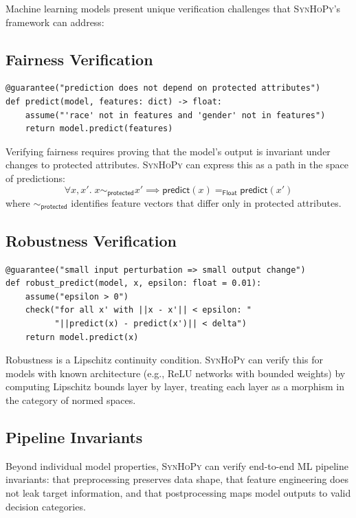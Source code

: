 \documentclass[11pt,a4paper]{report}
\theoremstyle{definition}
\theoremstyle{plain}
\newcommand{\synhopy}{\textsc{SynHoPy}}
\begin{document}
Machine learning models present unique verification challenges that
\synhopy{}'s framework can address:

\subsection{Fairness Verification}

\begin{lstlisting}[style=synhopy]
@guarantee("prediction does not depend on protected attributes")
def predict(model, features: dict) -> float:
    assume("'race' not in features and 'gender' not in features")
    return model.predict(features)
\end{lstlisting}

Verifying fairness requires proving that the model's output is invariant
under changes to protected attributes.  \synhopy{} can express this as a
path in the space of predictions:
\[
  \forall x, x'.\; x \sim_{\mathsf{protected}} x' \implies
  \mathsf{predict}(x) =_{\mathsf{Float}} \mathsf{predict}(x')
\]
where $\sim_{\mathsf{protected}}$ identifies feature vectors that differ
only in protected attributes.

\subsection{Robustness Verification}

\begin{lstlisting}[style=synhopy]
@guarantee("small input perturbation => small output change")
def robust_predict(model, x, epsilon: float = 0.01):
    assume("epsilon > 0")
    check("for all x' with ||x - x'|| < epsilon: "
          "||predict(x) - predict(x')|| < delta")
    return model.predict(x)
\end{lstlisting}

Robustness is a Lipschitz continuity condition.  \synhopy{} can verify
this for models with known architecture (e.g., ReLU networks with bounded
weights) by computing Lipschitz bounds layer by layer, treating each
layer as a morphism in the category of normed spaces.

\subsection{Pipeline Invariants}

Beyond individual model properties, \synhopy{} can verify end-to-end ML
pipeline invariants: that preprocessing preserves data shape, that
feature engineering does not leak target information, and that
postprocessing maps model outputs to valid decision categories.
\end{document}
